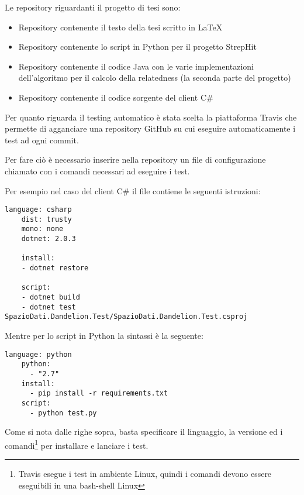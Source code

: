 Le repository riguardanti il progetto di tesi sono:

\begin{itemize}
    \item Repository contenente il testo della tesi scritto in \LaTeX~\cite{latex-repo}\\
    \item Repository contenente lo script in Python per il progetto StrepHit~\cite{strephit-repo}\\
    \item Repository contenente il codice Java con le varie implementazioni dell'algoritmo per il calcolo della relatedness (la seconda parte del progetto)~\cite{dandelion-repo}\\
    \item Repository contenente il codice sorgente del client C$\#$~\cite{client-repo} \\
\end{itemize} 

Per quanto riguarda il testing automatico è stata scelta la piattaforma Travis che permette di agganciare una repository GitHub su cui eseguire automaticamente i test 
ad ogni commit. 

Per fare ciò è necessario inserire nella repository un file di configurazione chiamato  con i comandi necessari ad eseguire i test. 

Per esempio nel caso del client C$\#$ il file  contiene le seguenti istruzioni:

\begin{lstlisting}[style=YmlStyle, caption=File configurazione travis.yml per progetti C$\#$]
    language: csharp
    dist: trusty
    mono: none
    dotnet: 2.0.3

    install:
    - dotnet restore

    script:
    - dotnet build
    - dotnet test SpazioDati.Dandelion.Test/SpazioDati.Dandelion.Test.csproj
\end{lstlisting}

Mentre per lo script in Python la sintassi è la seguente:
\begin{lstlisting}[style=YmlStyle, caption=File configurazione travis.yml per progetti Python]
    language: python
    python: 
      - "2.7"
    install:
      - pip install -r requirements.txt
    script:
      - python test.py
\end{lstlisting}

Come si nota dalle righe sopra, basta specificare il linguaggio, la versione ed i comandi\footnote{
    Travis esegue i test in ambiente Linux, quindi i comandi devono essere eseguibili in una bash-shell Linux
}
per installare e lanciare i test.

